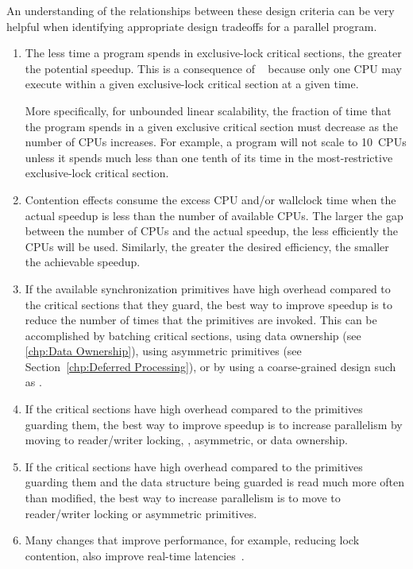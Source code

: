 An understanding of the relationships between these design criteria can
be very helpful when identifying appropriate design tradeoffs for a
parallel program.
\begin{enumerate}
\item	The less time a program spends in exclusive-lock critical sections,
	the greater the potential speedup.
	This is a consequence of ~\cite{GeneAmdahl1967AmdahlsLaw}
	because only one CPU may execute within a given
	exclusive-lock critical section at a given time.

	More specifically, for unbounded linear scalability, the fraction
	of time that the program spends in a given exclusive critical
	section must decrease as the number of CPUs increases.
	For example, a program will not scale to 10~CPUs
	unless it spends much less than one tenth of its time in the
	most-restrictive exclusive-lock critical section.
\item	Contention effects consume the excess CPU and/or
	wallclock time when the actual speedup is less than
	the number of available CPUs.  The
	larger the gap between the number of CPUs
	and the actual speedup, the less efficiently the
	CPUs will be used.
	Similarly, the greater the desired efficiency, the smaller
	the achievable speedup.
\item	If the available synchronization primitives have
	high overhead compared to the critical sections
	that they guard, the best way to improve speedup
	is to reduce the number of times that the primitives
	are invoked.
	This can be accomplished by batching critical sections,
	using data ownership (see \cref{chp:Data Ownership}),
	using asymmetric primitives
	(see Section~\ref{chp:Deferred Processing}),
	or by using a coarse-grained design such as .
\item	If the critical sections have high overhead compared
	to the primitives guarding them, the best way
	to improve speedup is to increase parallelism
	by moving to reader/writer locking, , asymmetric,
	or data ownership.
\item	If the critical sections have high overhead compared
	to the primitives guarding them and the data structure
	being guarded is read much more often than modified,
	the best way to increase parallelism is to move
	to reader/writer locking or asymmetric primitives.
\item	Many changes that improve  performance, for example,
	reducing lock contention, also improve real-time
	latencies~\cite{PaulMcKenney2005h}.
\end{enumerate}

